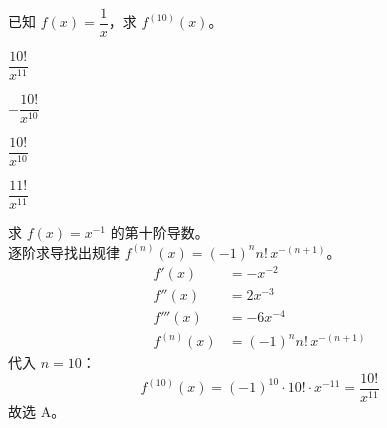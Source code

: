 \documentclass[12pt,a4paper]{exam-zh}
\begin{document}


\begin{question}
    已知 $f(x)=\dfrac{1}{x}$，求 $f^{(10)}(x)$。\paren[A]
    \begin{choices}
        \item $\dfrac{10!}{x^{11}}$
        \item $-\dfrac{10!}{x^{10}}$
        \item $\dfrac{10!}{x^{10}}$
        \item $\dfrac{11!}{x^{11}}$
    \end{choices}
\end{question}

\begin{solution}
    求 $f(x)=x^{-1}$ 的第十阶导数。 \\
    逐阶求导找出规律 $f^{(n)}(x)=(-1)^{n}n!\,x^{-(n+1)}$。
    \begin{align*}
        f'(x) &= -x^{-2} \\
        f''(x) &= 2x^{-3} \\
        f'''(x) &= -6x^{-4} \\
        f^{(n)}(x) &= (-1)^{n}n!\,x^{-(n+1)}
    \end{align*}
    代入 $n=10$：
    \[
        f^{(10)}(x) = (-1)^{10}\cdot10!\cdot x^{-11} = \frac{10!}{x^{11}}
    \]
    故选 A。
\end{solution}
\end{document}
